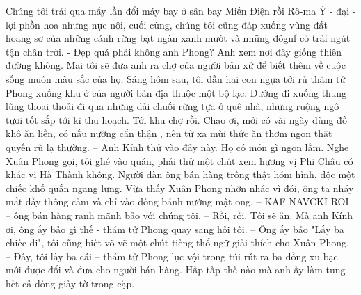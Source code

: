 	{\color{red}{THỔ NGỮ CHÂU PHI} } %
	\vskip 0.1cm 
	Chúng tôi trải qua mấy lần đổi máy bay ở sân bay Miến Điện rồi Rô-ma Ý - đại -lợi phồn hoa nhưng nực nội, cuối cùng, chúng tôi cũng đáp xuống vùng đất hoang sơ của những cánh rừng bạt ngàn xanh mướt và những đôgnf cỏ trải ngút tận chân trời. %
	\vskip 0.1cm
	- Đẹp quá phải không anh Phong? Anh xem nơi đây giống thiên đường không. Mai tôi sẽ đưa anh ra chợ của người bản xứ để biết thêm về cuộc sống muôn màu sắc của họ. 
	\vskip 0.1cm
	Sáng hôm sau, tôi dẫn hai con ngựa tới rủ thám tử Phong xuống khu ở của người bản địa thuộc một bộ lạc. Đường đi xuống thung lũng thoai thoải đi qua những dải chuối rừng tựa ở quê nhà, những ruộng ngô tươi tốt sắp tới kì thu hoạch. Tới khu chợ rồi. Chao ơi, mới có vài ngày dùng đồ khô ăn liền, có nấu nướng cẩn thận , nên từ xa mùi thức ăn thơm ngon thật quyến rũ lạ thường.
	\vskip 0.1cm
	-- Anh Kính thử vào đây này. Họ có món gì ngon lắm.
		\vskip 0.1cm
Nghe Xuân Phong gọi, tôi ghé vào quán, phải thử một chút xem hương vị Phi Châu có khác vị Hà Thành không.
	\vskip 0.1cm
	Người đàn ông bán hàng trông thật hóm hỉnh, độc một chiếc khố quấn ngang lưng. Vừa thấy Xuân Phong nhớn nhác vì đói, ông ta nháy mắt đầy thông cảm và chỉ vào đống bánh nướng mật ong.
	\vskip 0.1cm
	-- KAF NAVCKI ROI -- ông bán hàng ranh mãnh bảo với chúng tôi.
	\vskip 0.1cm
	-- Rồi, rồi. Tôi sẽ ăn. Mà anh Kính ơi, ông ấy bảo gì thế - thám tử Phong quay sang hỏi tôi.
	\vskip 0.1cm
	-- Ông ấy bảo "Lấy ba chiếc đi", tôi cũng biết võ vẽ một chút tiếng thổ ngữ giải thích cho Xuân Phong.
		\vskip 0.1cm
	-- Đây, tôi lấy ba cái -- thám tử Phong lục vội trong túi rút ra ba đồng xu bạc mới được đổi và đưa cho người bán hàng. Hấp tấp thế nào mà anh ấy làm tung hết cả đống giấy tờ trong cặp. 
